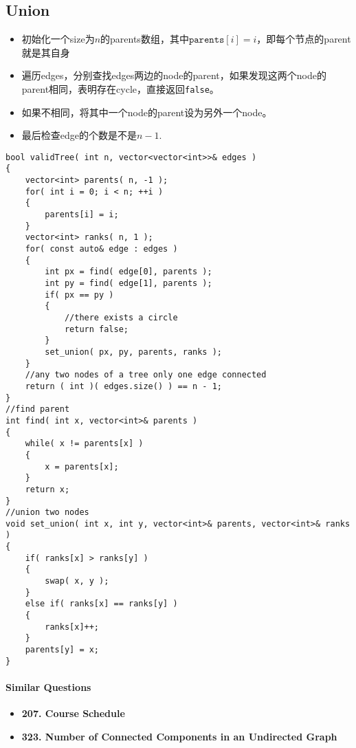 \subsection{Union}
\begin{itemize}
\item 初始化一个size为$n$的parents数组，其中$\texttt{parents}[i]=i$，即每个节点的parent就是其自身
\item 遍历edges，分别查找edges两边的node的parent，如果发现这两个node的parent相同，表明存在cycle，直接返回\texttt{false}。
\item 如果不相同，将其中一个node的parent设为另外一个node。
\item 最后检查edge的个数是不是$n-1$.
\end{itemize}
\begin{lstlisting}[style=customc, caption={Union Find}]
bool validTree( int n, vector<vector<int>>& edges )
{
    vector<int> parents( n, -1 );
    for( int i = 0; i < n; ++i )
    {
        parents[i] = i;
    }
    vector<int> ranks( n, 1 );
    for( const auto& edge : edges )
    {
        int px = find( edge[0], parents );
        int py = find( edge[1], parents );
        if( px == py )
        {
            //there exists a circle
            return false;
        }
        set_union( px, py, parents, ranks );
    }
    //any two nodes of a tree only one edge connected
    return ( int )( edges.size() ) == n - 1;
}
//find parent
int find( int x, vector<int>& parents )
{
    while( x != parents[x] )
    {
        x = parents[x];
    }
    return x;
}
//union two nodes
void set_union( int x, int y, vector<int>& parents, vector<int>& ranks )
{
    if( ranks[x] > ranks[y] )
    {
        swap( x, y );
    }
    else if( ranks[x] == ranks[y] )
    {
        ranks[x]++;
    }
    parents[y] = x;
}
\end{lstlisting}

\paragraph{Similar Questions}
\begin{itemize}
\item \textbf{207. Course Schedule}
\item \textbf{323. Number of Connected Components in an Undirected Graph}
\end{itemize}